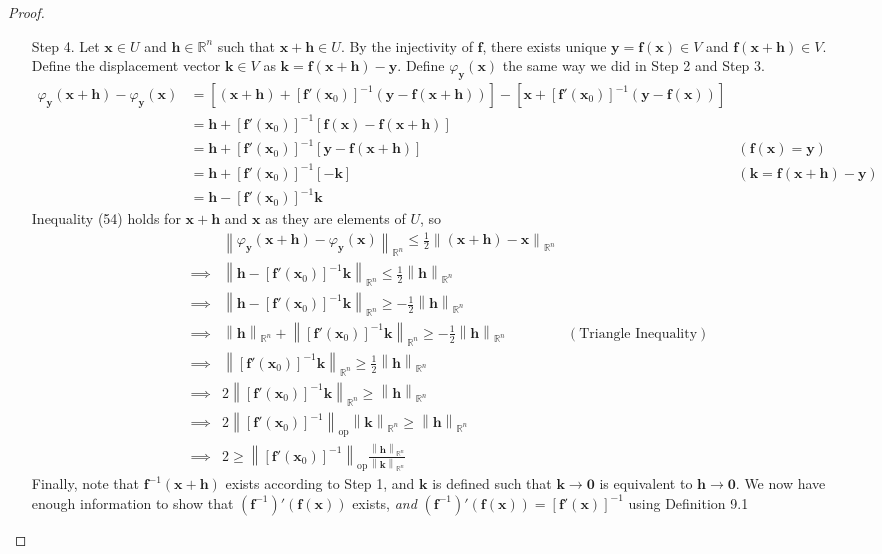 \documentclass{article}
\newcommand{\R}{\mathbb{R}}
\newcommand{\x}{\mathbf{x}}
\newcommand{\f}{\mathbf{f}}
\newcommand{\y}{\mathbf{y}}
\newcommand{\h}{\mathbf{h}}
\newcommand{\ze}{\mathbf{0}}
\newcommand{\norm}[1]{\left\lVert#1\right\rVert}
\newcommand{\normop}[1]{\left\lVert#1\right\rVert_\text{op}}
\theoremstyle{definition}
\begin{document}
\begin{proof}
\begin{enumerate}
\item [Step 4.] Let $ \x \in U $ and $ \h\in\R^n  $ such that $ \x+\h \in U $. By the injectivity of $ \f $, there exists unique $ \y = \f(\x)\in V $ and $ \f(\x+\mathbf h) \in V $. Define the displacement vector $ \mathbf k\in V $ as $ \mathbf k = \f(\x+\mathbf h) - \y $. Define $ \varphi_\y(\x) $ the same way we did in Step 2 and Step 3.  
\begin{align*}
	\varphi_\y(\x+\h) - \varphi_\y(\x) & = \left[(\x+\h) + \left[\f'(\x_0)\right]^{-1}(\y-\f(\x+\h))\right] - \left[\x + \left[\f'(\x_0)\right]^{-1}(\y-\f(\x))\right] \\ 
	& = \h + \left[\f'(\x_0)\right]^{-1}\left[\f(\x) - \f(\x + \h) \right] \\ 
	& = \h + \left[\f'(\x_0)\right]^{-1}\left[\y - \f(\x + \h) \right] & (\f(\x) = \y)\\
	& = \h + \left[\f'(\x_0)\right]^{-1}[-\mathbf k]  & (\mathbf k =\f(\x+\mathbf h) -\y)\\
	& = \h - \left[\f'(\x_0)\right]^{-1}\mathbf k
\end{align*}
Inequality (54) holds for $ \x+\h $ and $ \x $ as they are elements of $ U $, so 
\begin{align}
&\norm{	\varphi_\y(\x+\h) - \varphi_\y(\x) }_{\R^n}\le \frac{1}{2}\norm{(\x+\h) - \x}_{\R^n}\nonumber\\
\implies& \norm{\h - \left[\f'(\x_0)\right]^{-1}\mathbf k }_{\R^n} \le \frac{1}{2}\norm{\h}_{\R^n} \nonumber\\
\implies & \norm{\h - \left[\f'(\x_0)\right]^{-1}\mathbf k }_{\R^n} \ge -\frac{1}{2}\norm{\h}_{\R^n}\nonumber\\\implies & \norm{\h}_{\R^n} + \norm{\left[\f'(\x_0)\right]^{-1}\mathbf k }_{\R^n} \ge -\frac{1}{2}\norm{\h}_{\R^n} & (\text{Triangle Inequality})\nonumber\\
\implies &\norm{\left[\f'(\x_0)\right]^{-1}\mathbf k }_{\R^n} \ge \frac{1}{2}\norm{\h}_{\R^n} \nonumber\\
\implies &2\norm{\left[\f'(\x_0)\right]^{-1}\mathbf k }_{\R^n} \ge \norm{\h}_{\R^n} \nonumber \\ 
\implies &2\normop{\left[\f'(\x_0)\right]^{-1}} \norm{\mathbf k }_{\R^n}\ge \norm{\h}_{\R^n} \nonumber
\\ 
\implies &2\ge \normop{\left[\f'(\x_0)\right]^{-1}}\frac{\norm{\mathbf h}_{\R^n}}{\norm{\mathbf k}_{\R^n}}
\end{align}
Finally, note that $ \f^{-1}(\x+\h) $ exists according to Step 1, and $ \mathbf k $ is defined such that $ \mathbf k\to\ze  $ is equivalent to $ \mathbf h\to \ze $. We now have enough information to show that $(\f^{-1})'(\f(\x))$ exists, \textit{and} $(\f^{-1})'(\f(\x))= [\f'(\x)]^{-1}$ using Definition 9.1 

\end{enumerate}
\end{proof}
\end{document}
